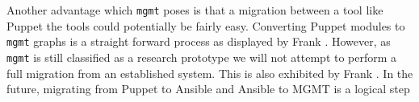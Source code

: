 Another advantage which \texttt{mgmt} poses is that a migration between a tool like Puppet the tools could potentially be fairly easy. Converting Puppet modules to \texttt{mgmt} graphs is a straight forward process as displayed by Frank \cite{frank_2016}. However, as \texttt{mgmt} is still classified as a research prototype we will not attempt to perform a full migration from an established system.  This is also exhibited by Frank \cite{frank_2016}. In the future, migrating from Puppet to Ansible and Ansible to MGMT is a logical step

